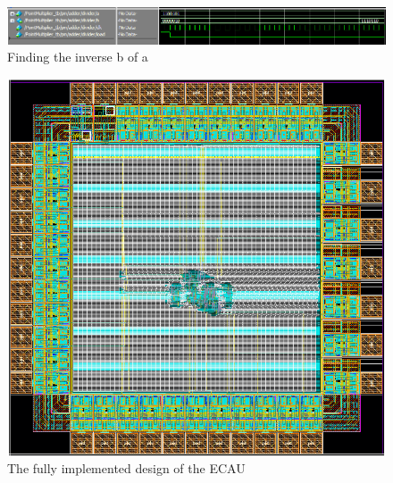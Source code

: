 \documentclass{IEEEtran}
\begin{document}
\begin{figure}[h]
\centering
\captionsetup{justification=centering}
\includegraphics[scale=0.75]{images/sim2.png}
\caption{Finding the inverse b of a}
\label{sim2}
\end{figure}

\clearpage

\begin{figure}[h]
\centering
\captionsetup{justification=centering}
\includegraphics{images/chip.png}
\caption{The fully implemented design of the ECAU}
\label{chip}
\end{figure}
\end{document}
